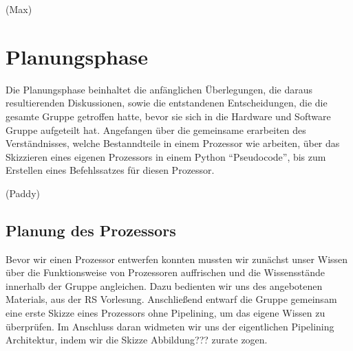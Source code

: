 \documentclass[paper=a4,fontsize=12pt,twocolumn]{scrreprt}
\begin{document}

(Max)

\chapter{Planungsphase}
\label{chap:Planungsphase}

Die Planungsphase beinhaltet die anfänglichen Überlegungen, die daraus resultierenden Diskussionen, sowie die entstandenen Entscheidungen, die die gesamte Gruppe getroffen hatte, bevor sie sich in die Hardware und Software Gruppe aufgeteilt hat.
Angefangen über die gemeinsame erarbeiten des Verständnisses, welche Bestanndteile in einem Prozessor wie arbeiten, über das Skizzieren eines eigenen Prozessors in einem Python \enquote{Pseudocode}, bis zum Erstellen eines Befehlssatzes für diesen Prozessor.

(Paddy)

\section{Planung des Prozessors}
Bevor wir einen Prozessor entwerfen konnten mussten wir zunächst unser Wissen über die Funktionsweise von Prozessoren auffrischen und die Wissensstände innerhalb der Gruppe angleichen. Dazu bedienten wir uns des angebotenen Materials, aus der RS Vorlesung. Anschließend entwarf die Gruppe gemeinsam eine erste Skizze eines Prozessors ohne Pipelining, um das eigene Wissen zu überprüfen.
Im Anschluss daran widmeten wir uns der eigentlichen Pipelining Architektur, indem wir die Skizze Abbildung??? zurate zogen.



\end{document}
